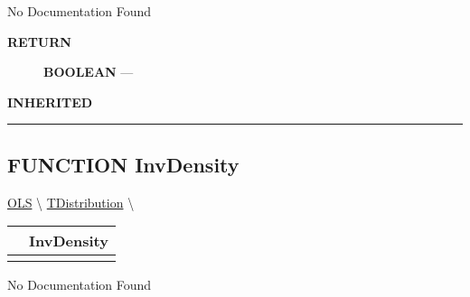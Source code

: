 \par





No Documentation Found








\par
\begin{description}
\item [\colorbox{tagtype}{\color{white} \textbf{\textsf{RETURN}}}] \textbf{BOOLEAN} --- 
\end{description}






\par
\begin{description}
\item [\colorbox{tagtype}{\color{white} \textbf{\textsf{INHERITED}}}] 
\end{description}



\rule{\linewidth}{0.5pt}
\subsection*{\textsf{\colorbox{headtoc}{\color{white} FUNCTION}
InvDensity}}

\hypertarget{ecldoc:linearregression.ols.tdistribution.invdensity}{}
\hspace{0pt} \hyperlink{ecldoc:linearregression.ols}{OLS} \textbackslash 
\hspace{0pt} \hyperlink{ecldoc:linearregression.ols.tdistribution}{TDistribution} \textbackslash 

{\renewcommand{\arraystretch}{1.5}
\begin{tabularx}{\textwidth}{|>{\raggedright\arraybackslash}l|X|}
\hline
\hspace{0pt}\mytexttt{\color{red} } & \textbf{InvDensity} \\
\hline
\multicolumn{2}{|>{\raggedright\arraybackslash}X|}{\hspace{0pt}\mytexttt{\color{param} (t\_FieldReal delta)}} \\
\hline
\end{tabularx}
}

\par





No Documentation Found






